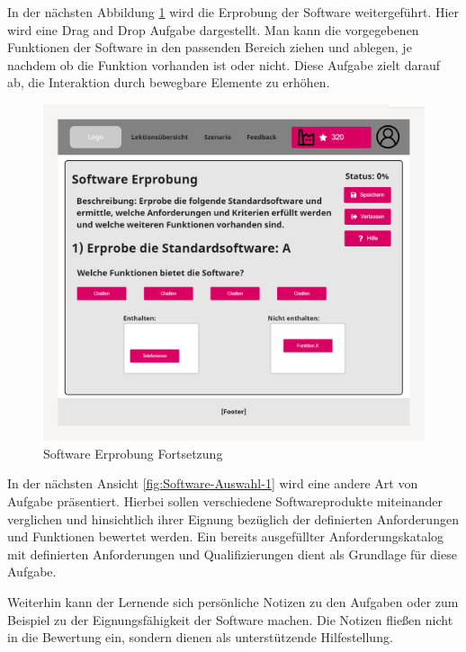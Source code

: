 In der nächsten Abbildung \ref{fig:Software-Erprobung-2} wird die Erprobung der Software weitergeführt. Hier wird eine Drag and Drop Aufgabe dargestellt. Man kann die vorgegebenen Funktionen der Software in den passenden Bereich ziehen und ablegen, je nachdem ob die Funktion vorhanden ist oder nicht. 
Diese Aufgabe zielt darauf ab, die Interaktion durch bewegbare Elemente zu erhöhen. 

\begin{figure}[H]
    \centering
    \includegraphics[width=1.0\textwidth]{assets/screenshots/mockups/Software-Erprobung-2.png}
    \caption{Software Erprobung Fortsetzung}
    \label{fig:Software-Erprobung-2}
\end{figure}

In der nächsten Ansicht \ref{fig:Software-Auswahl-1} wird eine andere Art von Aufgabe präsentiert.
Hierbei sollen verschiedene Softwareprodukte miteinander verglichen und hinsichtlich ihrer Eignung bezüglich der definierten Anforderungen und Funktionen bewertet werden. 
Ein bereits ausgefüllter Anforderungskatalog mit definierten Anforderungen und Qualifizierungen dient als Grundlage für diese Aufgabe.

Weiterhin kann der Lernende sich persönliche Notizen zu den Aufgaben oder zum Beispiel zu der Eignungsfähigkeit der Software machen. Die Notizen fließen nicht in die Bewertung ein, sondern dienen als unterstützende Hilfestellung. 

